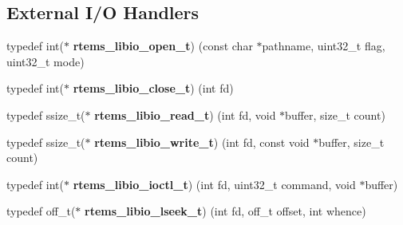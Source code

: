 \subsection*{External I/O Handlers}
\begin{DoxyCompactItemize}
\item 
\mbox{\label{group__LibIO_ga0a2af5c9b88a050b1df3a5d7869aae70}} 
typedef int($\ast$ {\bfseries rtems\+\_\+libio\+\_\+open\+\_\+t}) (const char $\ast$pathname, uint32\+\_\+t flag, uint32\+\_\+t mode)
\item 
\mbox{\label{group__LibIO_ga9eed54b52b3bb56d88a4a3ab8e0ee28b}} 
typedef int($\ast$ {\bfseries rtems\+\_\+libio\+\_\+close\+\_\+t}) (int fd)
\item 
\mbox{\label{group__LibIO_gafcfadd3ccf69043feb1f5f50b5be7c0e}} 
typedef ssize\+\_\+t($\ast$ {\bfseries rtems\+\_\+libio\+\_\+read\+\_\+t}) (int fd, void $\ast$buffer, size\+\_\+t count)
\item 
\mbox{\label{group__LibIO_ga284565322bb38287605c575cb7d0e357}} 
typedef ssize\+\_\+t($\ast$ {\bfseries rtems\+\_\+libio\+\_\+write\+\_\+t}) (int fd, const void $\ast$buffer, size\+\_\+t count)
\item 
\mbox{\label{group__LibIO_gac9c02c19a63839ad6950da109198ad03}} 
typedef int($\ast$ {\bfseries rtems\+\_\+libio\+\_\+ioctl\+\_\+t}) (int fd, uint32\+\_\+t command, void $\ast$buffer)
\item 
\mbox{\label{group__LibIO_ga7814da8e5fce28b8dfd13da8a855d55f}} 
typedef off\+\_\+t($\ast$ {\bfseries rtems\+\_\+libio\+\_\+lseek\+\_\+t}) (int fd, off\+\_\+t offset, int whence)
\end{DoxyCompactItemize}
